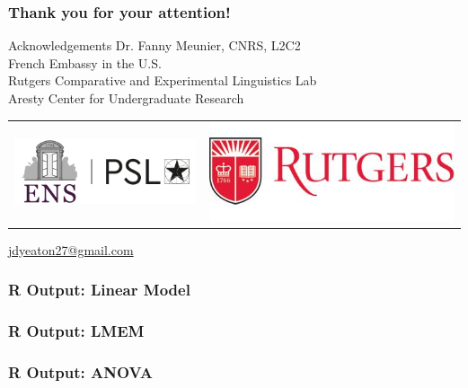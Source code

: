 \documentclass{beamer}
\begin{document}
\begin{frame}
\begin{center}
\frametitle{Thank you for your attention!}
\begin{block}{Acknowledgements}
Dr. Fanny Meunier, CNRS, L2C2\\
French Embassy in the U.S.\\
Rutgers Comparative and Experimental Linguistics Lab\\
Aresty Center for Undergraduate Research\\
\end{block}

\bigskip

\begin{tabular}{l r}
\includegraphics[width=.25\linewidth]{figures/psl.png} & \includegraphics[width=.25\linewidth]{figures/rutgers.jpeg} \\
\end{tabular}
\bigskip

\end{center}
\small{\url{jdyeaton27@gmail.com}}
\end{frame}

\begin{frame}
\frametitle{R Output: Linear Model}
\label{routput:lm}
\tiny
\hyperlink{lm}{}
\end{frame}

\begin{frame}
\frametitle{R Output: LMEM}
\label{routput:lmem}
\tiny
\hyperlink{lm}{}
\end{frame}

\begin{frame}
\frametitle{R Output: ANOVA}
\label{routput:anova}
\tiny
\hyperlink{lm}{}
\end{frame}
\end{document}
